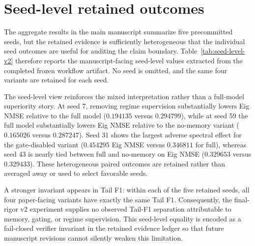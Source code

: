 
\section{Seed-level retained outcomes}
\label{sec:seed-level-v2}

The aggregate results in the main manuscript summarize five precommitted seeds, but the retained evidence is sufficiently heterogeneous that the individual seed outcomes are useful for auditing the claim boundary. Table~\ref{tab:seed-level-v2} therefore reports the manuscript-facing seed-level values extracted from the completed frozen workflow artifact. No seed is omitted, and the same four variants are retained for each seed.

\begin{table}[t]
\centering
\small

\caption{Seed-level outcomes from the frozen final-rigor v2 experiment. These 20 rows are the exact retained seed-by-variant surface used to reconstruct the manuscript aggregate. They are descriptive evidence only; the frozen protocol did not preregister a null-hypothesis significance test or practical-effect threshold.}
\label{tab:seed-level-v2}
\end{table}

The seed-level view reinforces the mixed interpretation rather than a full-model superiority story. At seed 7, removing regime supervision substantially lowers Eig NMSE relative to the full model ($0.194135$ versus $0.294799$), while at seed 59 the full model substantially lowers Eig NMSE relative to the no-memory variant ($0.165026$ versus $0.287247$). Seed 31 shows the largest adverse spectral effect for the gate-disabled variant ($0.454295$ Eig NMSE versus $0.346811$ for full), whereas seed 43 is nearly tied between full and no-memory on Eig NMSE ($0.329653$ versus $0.329433$). These heterogeneous paired outcomes are retained rather than averaged away or used to select favorable seeds.

A stronger invariant appears in Tail F1: within each of the five retained seeds, all four paper-facing variants have exactly the same Tail F1. Consequently, the final-rigor v2 experiment supplies no observed Tail-F1 separation attributable to memory, gating, or regime supervision. This seed-level equality is encoded as a fail-closed verifier invariant in the retained evidence ledger so that future manuscript revisions cannot silently weaken this limitation.

